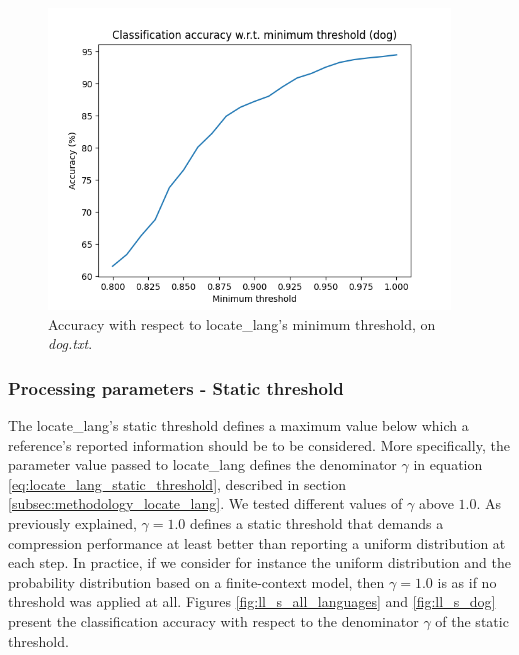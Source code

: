 \documentclass{article}
\begin{document}
\begin{figure}
    \centering
    \includegraphics[width=0.95\textwidth]{../results/ll_dog/ll-m.png}
    \caption{Accuracy with respect to locate_lang's minimum threshold, on \textit{dog.txt}.}
    \label{fig:ll_m_dog}
\end{figure}

\subsubsection{Processing parameters - Static threshold}
\label{subsubsec:results_locate_lang_static_threshold_processing}

The locate_lang's static threshold defines a maximum value below which a reference's reported information should be to be considered.
More specifically, the parameter value passed to locate_lang defines the denominator $\gamma$ in equation \ref{eq:locate_lang_static_threshold}, described in section \ref{subsec:methodology_locate_lang}.
We tested different values of $\gamma$ above $1.0$.
As previously explained, $\gamma = 1.0$ defines a static threshold that demands a compression performance at least better than reporting a uniform distribution at each step.
In practice, if we consider for instance the uniform distribution and the probability distribution based on a finite-context model, then $\gamma = 1.0$ is as if no threshold was applied at all.
Figures \ref{fig:ll_s_all_languages} and \ref{fig:ll_s_dog} present the classification accuracy with respect to the denominator $\gamma$ of the static threshold.
\end{document}
